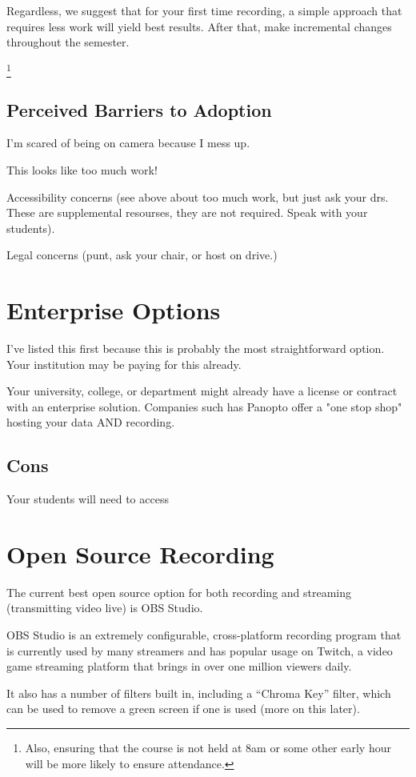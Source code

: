 \documentclass[sigconf]{acmart}
\begin{document}
Regardless, we suggest that for your first time recording, a simple approach that requires less work will yield best results.  
After that, make incremental changes throughout the semester.

\footnote{Also, ensuring that the course is not held at 8am or some other early hour will be more likely to ensure attendance.}

\subsection{Perceived Barriers to Adoption}
I'm scared of being on camera because I mess up.

This looks like too much work!

Accessibility concerns (see above about too much work, but just ask your drs.  These are supplemental resourses, they are not required.  Speak with your students).

Legal concerns (punt, ask your chair, or host on drive.)

\section{Enterprise Options}
I've listed this first because this is probably the most straightforward option.
Your institution may be paying for this already.

Your university, college, or department might already have a license or contract with an enterprise solution.
Companies such has Panopto  offer a "one stop shop" hosting your data AND recording.


\subsection{Cons}
Your students will need to access

\section{Open Source Recording}
The current best open source option for both recording and streaming (transmitting video live) is OBS Studio.

OBS Studio is an extremely configurable, cross-platform recording program that is currently used by many streamers and has popular usage on Twitch, a video game streaming platform that brings in over one million viewers daily.

It also has a number of filters built in, including a  ``Chroma Key'' filter, which can be used to remove a green screen if one is used (more on this later).
\end{document}
